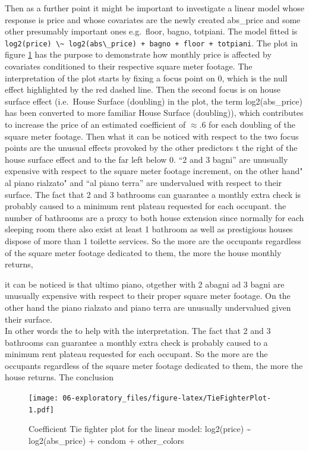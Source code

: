 \documentclass[
  12pt,
  a4paper,
  oneside]{book}
\newcommand{\passthrough}[1]{#1}
\theoremstyle{definition}
\theoremstyle{definition}
\theoremstyle{definition}
\theoremstyle{remark}
\begin{document}
Then as a further point it might be important to investigate a linear model whose response is price and whose covariates are the newly created abs\_price and some other presumably important ones e.g.~floor, bagno, totpiani. The model fitted is \passthrough{\lstinline!log2(price) \~ log2(abs\_price) + bagno + floor + totpiani!}.
The plot in figure \ref{fig:TieFighterPlot} has the purpose to demonstrate how monthly price is affected by covariates conditioned to their respective square meter footage. The interpretation of the plot starts by fixing a focus point on 0, which is the null effect highlighted by the red dashed line. Then the second focus is on house surface effect (i.e.~House Surface (doubling) in the plot, the term log2(abs\_price) has been converted to more familiar House Surface (doubling)), which contributes to increase the price of an estimated coefficient of \(\approx .6\) for each doubling of the square meter footage. Then what it can be noticed with respect to the two focus points are the unusual effects provoked by the other predictors t the right of the house surface effect and to the far left below 0. ``2 and 3 bagni'' are unusually expensive with respect to the square meter footage increment, on the other hand" al piano rialzato" and ``al piano terra'' are undervalued with respect to their surface. The fact that 2 and 3 bathrooms can guarantee a monthly extra check is probably caused to a minimum rent plateau requested for each occupant. the number of bathrooms are a proxy to both house extension since normally for each sleeping room there also exist at least 1 bathroom as well as prestigious houses dispose of more than 1 toilette services. So the more are the occupants regardless of the square meter footage dedicated to them, the more the house monthly returns,

it can be noticed is that ultimo piano, otgether with 2 abagni ad 3 bagni are unusually expensive with respect to their proper square meter footage. On the other hand the piano rialzato and piano terra are unusually undervalued given their surface.\\
In other words the to help with the interpretation. The fact that 2 and 3 bathrooms can guarantee a monthly extra check is probably caused to a minimum rent plateau requested for each occupant. So the more are the occupants regardless of the square meter footage dedicated to them, the more the house returns. The conclusion

\begin{figure}
\centering
\texttt{[image: 06-exploratory\_files/figure-latex/TieFighterPlot-1.pdf]}
\caption{\label{fig:TieFighterPlot}Coefficient Tie fighter plot for the linear model: log2(price) \textasciitilde{} log2(abs\_price) + condom + other\_colors}
\end{figure}
\end{document}
